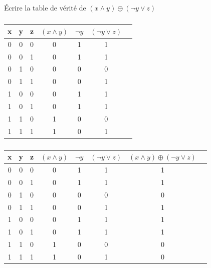 \documentclass[svgnames,11pt]{beamer}
\begin{document}
\begin{frame}
    \frametitle{}

    \begin{activite}
    Écrire la table de vérité de $(x\land y)\oplus (\lnot y \lor z)$
    \end{activite}

\end{frame}
\begin{frame}
    \frametitle{}

    \begin{center}
        \begin{tabular}{|*7{c|}}
        \hline 
        x & y & z & $(x\land y)$ & $\lnot y$ & $(\lnot y \lor z)$\\ 
        \hline 
0 & 0 & 0 &0&1&1\\
\hline 
0 & 0 & 1 &0&1&1\\
\hline 
0 & 1 & 0 &0&0&0\\
\hline 
0 & 1 & 1 &0&0&1\\
\hline 
1 & 0 & 0 &0&1&1\\
\hline 
1 & 0 & 1 &0&1&1\\
\hline 
1 & 1 & 0 &1&0&0\\
\hline 
1 & 1 & 1 &1&0&1\\
\hline
        \end{tabular}
        \end{center}

\end{frame}
\begin{frame}
    \frametitle{}

    \begin{center}
        \begin{tabular}{|*8{c|}}
        \hline 
        x & y & z & $(x\land y)$ & $\lnot y$ & $(\lnot y \lor z)$&$(x\land y)\oplus (\lnot y \lor z)$\\ 
        \hline 
0 & 0 & 0 &0&1&1&1\\
\hline 
0 & 0 & 1 &0&1&1&1\\
\hline 
0 & 1 & 0 &0&0&0&0\\
\hline 
0 & 1 & 1 &0&0&1&1\\
\hline 
1 & 0 & 0 &0&1&1&1\\
\hline 
1 & 0 & 1 &0&1&1&1\\
\hline 
1 & 1 & 0 &1&0&0&0\\
\hline 
1 & 1 & 1 &1&0&1&0\\
\hline
        \end{tabular}
        \end{center}

\end{frame}
\end{document}

